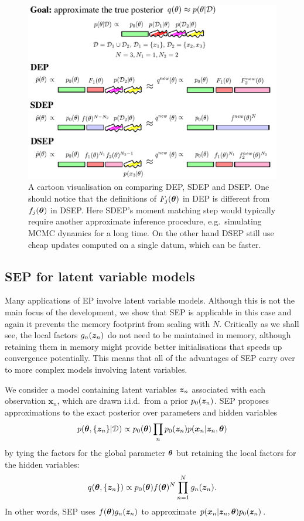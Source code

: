 \begin{figure}[ht]
\centering
\includegraphics[width=1\linewidth]{Chapter3/sep/fig/dsep.pdf}
\caption{A cartoon visualisation on comparing DEP, SDEP and DSEP. One should notice that the definitions of $F_j(\bm{\theta})$ in DEP is different from $f_j(\bm{\theta})$ in DSEP. Here SDEP's moment matching step would typically require another approximate inference procedure, e.g.~simulating MCMC dynamics for a long time. On the other hand DSEP still use cheap updates computed on a single datum, which can be faster.}
\label{fig:chap3_dsep_compare}
\end{figure}

\subsection{SEP for latent variable models}

Many applications of EP involve latent variable models. Although this is not the main focus of the development, we show that SEP is applicable in this case and again it prevents the memory footprint from scaling with $N$. Critically as we shall see, the local factors $g_n(\bm{z}_n)$ do not need to be maintained in memory, although retaining them in memory might provide better initialisations that speeds up convergence potentially. This means that all of the advantages of SEP carry over to more complex models involving latent variables.

%
We consider a model containing latent variables $\bm{z}_n$ associated with each observation $\bm{x}_n$, which are drawn i.i.d.~from a prior $p_0(\bm{z}_n)$. SEP proposes approximations to the exact posterior over parameters and hidden variables 
\begin{equation}
p(\bm{\theta}, \{ \bm{z}_n\} | \mathcal{D}) \propto p_0(\bm{\theta}) \prod_n p_0(\bm{z}_n) p(\bm{x}_n | \bm{z}_n, \bm{\theta})
\end{equation}
by tying the factors for the global parameter $\bm{\theta}$ but retaining the local factors for the hidden variables:
%
\begin{equation}
q(\bm{\theta}, \{ \bm{z}_n\}) \propto p_0(\bm{\theta}) f(\bm{\theta})^N \prod_{n=1}^N g_n(\bm{z}_n) .
\end{equation}
In other words, SEP uses $f(\bm{\theta}) g_n(\bm{z}_n)$ to approximate $p(\bm{x}_n | \bm{z}_n, \bm{\theta})p_0(\bm{z}_n)$.

